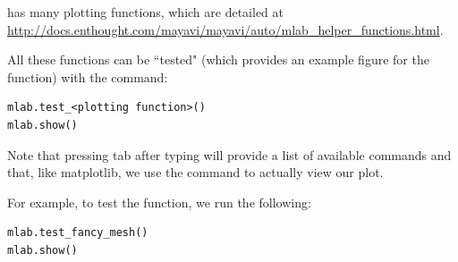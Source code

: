  has many plotting functions, which are detailed at \url{http://docs.enthought.com/mayavi/mayavi/auto/mlab_helper_functions.html}.

All these functions can be ``tested" (which provides an example figure for the function) with the command:
\begin{lstlisting}
mlab.test_<plotting function>()
mlab.show()
\end{lstlisting}
Note that pressing tab after typing  will provide a list of available commands and that, like matplotlib, we use the  command to actually view our plot.

For example, to test the  function, we run the following:
\begin{lstlisting}
mlab.test_fancy_mesh()
mlab.show()
\end{lstlisting}

